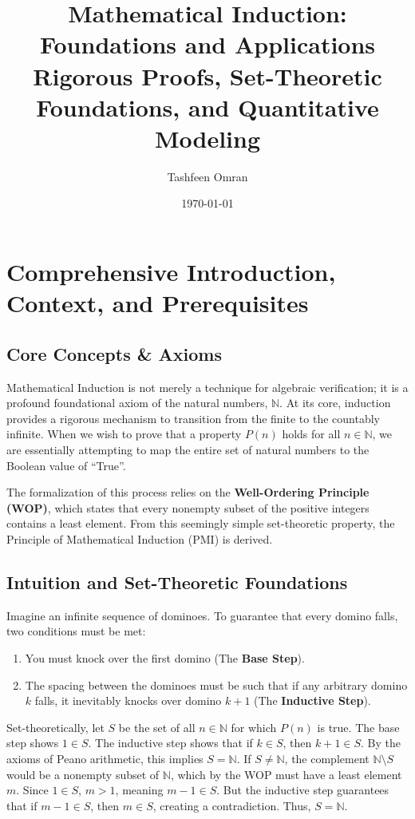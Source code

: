 \documentclass[11pt, a4paper]{article}
\theoremstyle{definition}
\theoremstyle{remark}
\newcommand{\N}{\mathbb{N}}
\begin{document}
\title{\textbf{Mathematical Induction: Foundations and Applications}\\ \Large Rigorous Proofs, Set-Theoretic Foundations, and Quantitative Modeling}
\author{Tashfeen Omran}
\date{\today}

\maketitle
\tableofcontents
\newpage

\section{Comprehensive Introduction, Context, and Prerequisites}

\subsection{Core Concepts \& Axioms}
Mathematical Induction is not merely a technique for algebraic verification; it is a profound foundational axiom of the natural numbers, $\N$. At its core, induction provides a rigorous mechanism to transition from the finite to the countably infinite. When we wish to prove that a property $P(n)$ holds for all $n \in \N$, we are essentially attempting to map the entire set of natural numbers to the Boolean value of ``True''. 

The formalization of this process relies on the \textbf{Well-Ordering Principle (WOP)}, which states that every nonempty subset of the positive integers contains a least element. From this seemingly simple set-theoretic property, the Principle of Mathematical Induction (PMI) is derived. 

\subsection{Intuition and Set-Theoretic Foundations}
Imagine an infinite sequence of dominoes. To guarantee that every domino falls, two conditions must be met:
\begin{enumerate}
    \item You must knock over the first domino (The \textbf{Base Step}).
    \item The spacing between the dominoes must be such that if any arbitrary domino $k$ falls, it inevitably knocks over domino $k+1$ (The \textbf{Inductive Step}).
\end{enumerate}
Set-theoretically, let $S$ be the set of all $n \in \N$ for which $P(n)$ is true. The base step shows $1 \in S$. The inductive step shows that if $k \in S$, then $k+1 \in S$. By the axioms of Peano arithmetic, this implies $S = \N$. If $S \neq \N$, the complement $\N \setminus S$ would be a nonempty subset of $\N$, which by the WOP must have a least element $m$. Since $1 \in S$, $m > 1$, meaning $m-1 \in S$. But the inductive step guarantees that if $m-1 \in S$, then $m \in S$, creating a contradiction. Thus, $S = \N$.
\end{document}
